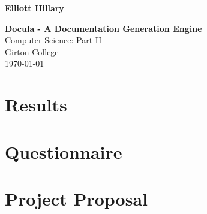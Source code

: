 \documentclass[twoside,12pt,notitlepage]{Classes/CUEDthesisPSnPDF}
\begin{document}
\pagestyle{empty}

\hfill{\LARGE \bf Elliott Hillary}

\vspace*{60mm}
\begin{center}
\Huge
{\bf Docula - A Documentation Generation Engine} \\
\vspace*{5mm}
Computer Science: Part II\\
\vspace*{5mm}
Girton College \\
\vspace*{5mm}
\today  %
\end{center}

\setcounter{secnumdepth}{3}
\setcounter{tocdepth}{3}

\frontmatter %
\cleardoublepage

\cleardoublepage


\begingroup
\hypersetup{linkcolor=black}
\tableofcontents
\endgroup

\mainmatter %
\pagestyle{fancy}






\printbibliography

\begin{appendices}
\chapter{Results}




\chapter{Questionnaire}


\chapter{Project Proposal}

\end{appendices}
\end{document}
